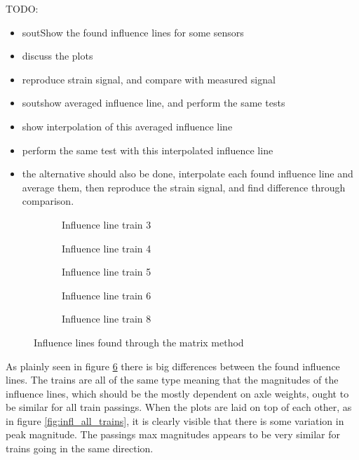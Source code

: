 TODO:
\begin{itemize}
\item sout{Show the found influence lines for some sensors}
\item discuss the plots
\item reproduce strain signal, and compare with measured signal
\item sout{show averaged influence line}, and perform the same tests
\item show interpolation of this averaged influence line
\item perform the same test with this interpolated influence line
\item the alternative should also be done, interpolate each found influence line and average them, then reproduce the strain signal, and find difference through comparison.
\end{itemize}


\begin{figure}[H]
\centering
\begin{subfigure}[t]{0.4\textwidth}
	\centering
	
	\caption{Influence line train 3}
	\label{fig:train3}
\end{subfigure}
\qquad
\begin{subfigure}[t]{0.4\textwidth}
	\centering
	
	\caption{Influence line train 4}
	\label{fig:train4}
\end{subfigure}

\begin{subfigure}[t]{0.4\textwidth}
	\centering
	
	\caption{Influence line train 5}
	\label{fig:train5}
\end{subfigure}
\qquad
\begin{subfigure}[t]{0.4\textwidth}
	\centering
	
	\caption{Influence line train 6}
	\label{fig:train6}
\end{subfigure}

\begin{subfigure}[t]{0.9\textwidth}
	\centering
	
	\caption{Influence line train 8}
	\label{fig:train8}
\end{subfigure}
\caption{Influence lines found through the matrix method}
\label{fig:Influence_lines}
\end{figure}



As plainly seen in figure \ref{fig:Influence_lines} there is big differences between the found influence lines. The trains are all of the same type meaning that the magnitudes of the influence lines, which should be the mostly dependent on axle weights, ought to be similar for all train passings.  When the plots are laid on top of each other, as in figure \ref{fig:infl_all_trains}, it is clearly visible that there is some variation in peak magnitude. The passings max magnitudes appears to be very similar for trains going in the same direction.
